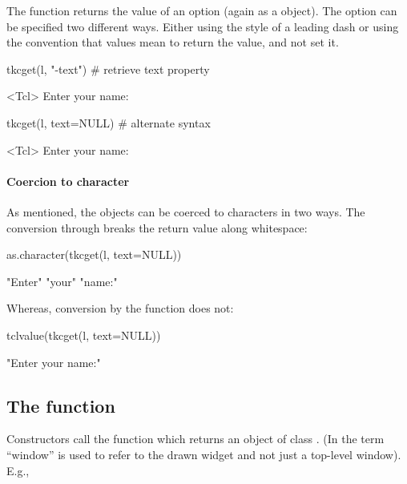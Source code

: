 The  function returns the value of an
option (again as a  object). The option can be specified
two different ways. Either using the \TK\/ style of a leading dash or
using the \R{} convention that  values mean to return the value,
and not set it.


\begin{Schunk}
\begin{Sinput}
 tkcget(l, "-text")                   # retrieve text property
\end{Sinput}
\begin{Soutput}
<Tcl> Enter your name: 
\end{Soutput}
\begin{Sinput}
 tkcget(l, text=NULL)                 # alternate syntax
\end{Sinput}
\begin{Soutput}
<Tcl> Enter your name: 
\end{Soutput}
\end{Schunk}

\paragraph{Coercion to character}
As mentioned, the  objects can be coerced to characters in two ways.
The conversion through  breaks the return value along whitespace:
\begin{Schunk}
\begin{Sinput}
 as.character(tkcget(l, text=NULL))
\end{Sinput}
\begin{Soutput}
[1] "Enter" "your"  "name:"
\end{Soutput}
\end{Schunk}
%
Whereas, conversion by the  function does not:
\begin{Schunk}
\begin{Sinput}
 tclvalue(tkcget(l, text=NULL))
\end{Sinput}
\begin{Soutput}
[1] "Enter your name:"
\end{Soutput}
\end{Schunk}
%

\subsection{The  function}
\label{sec:codetkw-funct}


Constructors call the  function which returns an
object of class . (In \TK\/ the term ``window'' is used to
refer to the drawn widget and not just a top-level window). E.g.,

